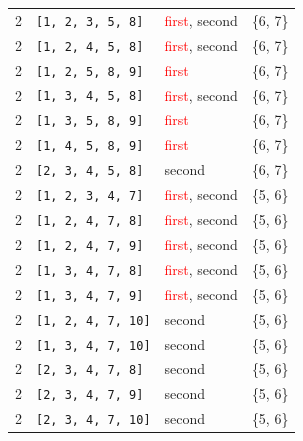 \begin{longtable}{|p{2.5cm}|p{3cm}|p{2.5cm}|c|}
\rowcolor{Light_Blue}
2 & \texttt{[1, 2, 3, 5, 8]} & \textcolor{red}{first}, \textcolor{CustomBlue}{second} & \{6, 7\} \\ 
2 & \texttt{[1, 2, 4, 5, 8]} & \textcolor{red}{first}, \textcolor{CustomBlue}{second} & \{6, 7\} \\ 
2 & \texttt{[1, 2, 5, 8, 9]} & \textcolor{red}{first} & \{6, 7\} \\ 
2 & \texttt{[1, 3, 4, 5, 8]} & \textcolor{red}{first}, \textcolor{CustomBlue}{second} & \{6, 7\} \\ 
2 & \texttt{[1, 3, 5, 8, 9]} & \textcolor{red}{first} & \{6, 7\} \\ 
2 & \texttt{[1, 4, 5, 8, 9]} & \textcolor{red}{first} & \{6, 7\} \\ 
2 & \texttt{[2, 3, 4, 5, 8]} & \textcolor{CustomBlue}{second} & \{6, 7\} \\ \hline \hline

\rowcolor{Light_Blue}
2 & \texttt{[1, 2, 3, 4, 7]} & \textcolor{red}{first}, \textcolor{CustomBlue}{second} & \{5, 6\} \\ 
2 & \texttt{[1, 2, 4, 7, 8]} & \textcolor{red}{first}, \textcolor{CustomBlue}{second} & \{5, 6\} \\ 
2 & \texttt{[1, 2, 4, 7, 9]} & \textcolor{red}{first}, \textcolor{CustomBlue}{second} & \{5, 6\} \\ 
2 & \texttt{[1, 3, 4, 7, 8]} & \textcolor{red}{first}, \textcolor{CustomBlue}{second} & \{5, 6\} \\ 
2 & \texttt{[1, 3, 4, 7, 9]} & \textcolor{red}{first}, \textcolor{CustomBlue}{second} & \{5, 6\} \\ 
2 & \texttt{[1, 2, 4, 7, 10]} & \textcolor{CustomBlue}{second} & \{5, 6\} \\ 
2 & \texttt{[1, 3, 4, 7, 10]} & \textcolor{CustomBlue}{second} & \{5, 6\} \\ 
2 & \texttt{[2, 3, 4, 7, 8]} & \textcolor{CustomBlue}{second} & \{5, 6\} \\ 
2 & \texttt{[2, 3, 4, 7, 9]} & \textcolor{CustomBlue}{second} & \{5, 6\} \\ 
2 & \texttt{[2, 3, 4, 7, 10]} & \textcolor{CustomBlue}{second} & \{5, 6\} \\ \hline \hline 


\end{longtable}
